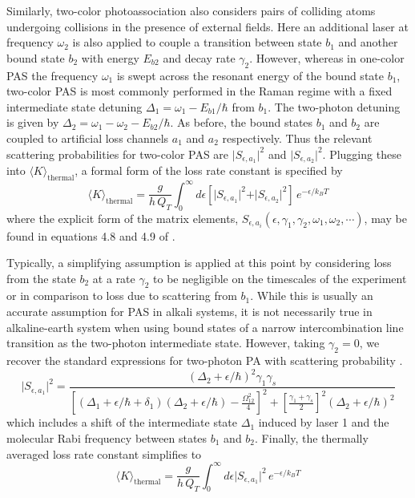 Similarly, two-color photoassociation also considers pairs of colliding atoms undergoing collisions in the presence of external fields.
Here an additional laser at frequency $\omega_2$ is also applied to couple a transition between state $b_1$ and another bound state $b_2$ with energy $E_{b2}$ and decay rate $\gamma_2$.
However, whereas in one-color PAS the frequency $\omega_1$ is swept across the resonant energy of the bound state $b_1$, two-color PAS is most commonly performed in the Raman regime with a fixed intermediate state detuning $\Delta_1 = \omega_1 - E_{b1}/\hbar$ from $b_1$.
The two-photon detuning is given by $\Delta_2 = \omega_1 - \omega_2 - E_{b2}/\hbar$.
As before, the bound states $b_1$ and $b_2$ are coupled to artificial loss channels $a_1$ and $a_2$ respectively.
Thus the relevant scattering probabilities for two-color PAS are $\vert S_{\epsilon, a_1} \vert^2$ and $\vert S_{\epsilon, a_2} \vert^2$.
Plugging these into $\langle K \rangle_\text{thermal}$, a formal form of the loss rate constant is specified by
\begin{equation} \label{eq:kLoss2Ph}
  \langle K \rangle_\text{thermal} = \frac{g}{h\,Q_{T}} \int_{0}^{\infty} d\epsilon \left[ \vert S_{\epsilon, a_1} \vert^2 + \vert S_{\epsilon, a_2} \vert^2 \right] \,e^{-\epsilon/k_{B}T}
\end{equation}
where the explicit form of the matrix elements, $S_{\epsilon, a_i}(\epsilon,\gamma_1,\gamma_2,\omega_1,\omega_2,\cdots)$, may be found in equations 4.8 and 4.9 of \cite{Bohn1999}.

Typically, a simplifying assumption is applied at this point by considering loss from the state $b_2$ at a rate $\gamma_2$ to be negligible on the timescales of the experiment or in comparison to loss due to scattering from $b_1$.
While this is usually an accurate assumption for PAS in alkali systems, it is not necessarily true in alkaline-earth system when using bound states of a narrow intercombination line transition as the two-photon intermediate state.
However, taking $\gamma_2=0$, we recover the standard expressions for two-photon PA with scattering probability \cite{MartinezDeEscobar2008,Jones2006,Napolitano1994,Pachomov2017}.
\begin{equation} \label{eq:twoPhotonSe1}
	\vert  S_{\epsilon, a_1} \vert^2 = \frac{(\Delta_2 + \epsilon/\hbar)^2 \gamma_1 \gamma_s}{
  	\left[ (\Delta_1+\epsilon/\hbar+\delta_1) (\Delta_2+\epsilon/\hbar)-\frac{\Omega_{12}^{2}}{4}\right]^2 + \left[ \frac{\gamma_1 + \gamma_s}{2}\right]^2 (\Delta_2+\epsilon/\hbar)^2}
\end{equation}
which includes a shift of the intermediate state $\Delta_1$ induced by laser 1 and the molecular Rabi frequency between states $b_1$ and $b_2$.
Finally, the thermally averaged loss rate constant simplifies to
\begin{equation} \label{eq:twoPhotonKavg}
	\langle K \rangle_\text{thermal}  = \frac{g}{h\,Q_{T}} \int_{0}^{\infty} d\epsilon \vert  S_{\epsilon, a_1} \vert^2 \,e^{-\epsilon/k_{B}T}
\end{equation}



